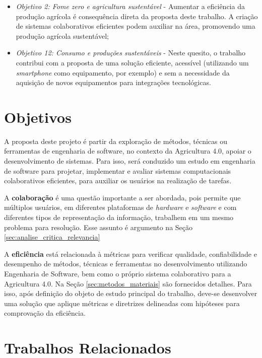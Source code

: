 \documentclass[12pt]{article}
\begin{document}
\begin{itemize}
	\item \textit{Objetivo 2: Fome zero e agricultura sustentável} - Aumentar a eficiência da produção agrícola é consequência direta da proposta deste trabalho. A criação de sistemas colaborativos eficientes podem auxiliar na área, promovendo uma produção agrícola sustentável;
	\item \textit{Objetivo 12: Consumo e produções sustentáveis} - Neste quesito, o trabalho contribui com a proposta de uma solução eficiente, acessível (utilizando um \textit{smartphone} como equipamento, por exemplo) e sem a necessidade da aquisição de novos equipamentos para integrações tecnológicas.
\end{itemize}

\section{Objetivos}
\label{sec:objetivos}

A proposta deste projeto é partir da exploração de métodos, técnicas ou ferramentas de engenharia de software, no contexto da Agricultura 4.0, apoiar o desenvolvimento de sistemas. Para isso, será conduzido um estudo em engenharia de software para projetar, implementar e avaliar sistemas computacionais colaborativos eficientes, para auxiliar os usuários na realização de tarefas.

A \textbf{colaboração} é uma questão importante a ser abordada, pois permite que múltiplos usuários, em diferentes plataformas de \textit{hardware} e \textit{software} e com diferentes tipos de representação da informação, trabalhem em um mesmo problema para resolução. Esse assunto é argumento na Seção \ref{sec:analise_critica_relevancia}

A \textbf{eficiência} está relacionada à métricas para verificar qualidade, confiabilidade e desempenho de métodos, técnicas e ferramentas no desenvolvimento utilizando Engenharia de Software, bem como o próprio sistema colaborativo para a Agricultura 4.0. Na Seção \ref{sec:metodos_materiais} são fornecidos detalhes. Para isso, após definição do objeto de estudo principal do trabalho, deve-se desenvolver uma solução que aplique métricas e diretrizes delineadas com hipóteses para comprovação da eficiência.

\section{Trabalhos Relacionados}
\label{sec:trabalhos_relacionados}
\end{document}
